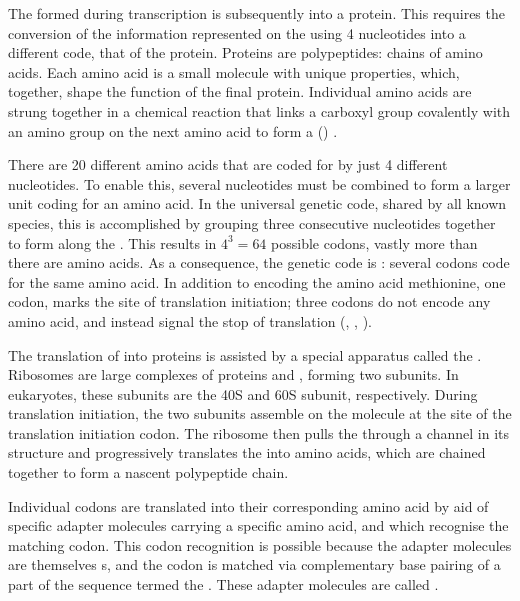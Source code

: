 The \mrna formed during transcription is subsequently  into a
protein. This requires the conversion of the information represented on the
\mrna using \num{4} nucleotides  into a different code, that of the protein.
Proteins are polypeptides: chains of amino acids. Each amino acid is a small
molecule with unique properties, which, together, shape the function of the
final protein. Individual amino acids are strung together in a chemical reaction
that links a carboxyl group covalently with an amino group on the next amino
acid to form a  ()
\citep{Alberts:2002}.

There are \num{20} different amino acids that are coded for by just \num{4}
different nucleotides. To enable this, several nucleotides must be combined to
form a larger unit coding for an amino acid. In the universal genetic code,
shared by all known species, this is accomplished by grouping three consecutive
nucleotides together to form  along the \mrna. This results in
\(4^3 = 64\) possible codons, vastly more than there are amino acids. As a
consequence, the genetic code is : several codons code for
the same amino acid. In addition to encoding the amino acid methionine, one
codon,  marks the site of translation initiation; three codons do not
encode any amino acid, and instead signal the stop of translation (,
, ).

The translation of \mrna into proteins is assisted by a special apparatus called
the . Ribosomes are large complexes of proteins and \rrna,
forming two subunits. In eukaryotes, these subunits are the 40S and 60S subunit,
respectively. During translation initiation, the two subunits assemble on the
\mrna molecule at the site of the translation initiation codon. The ribosome
then pulls the \mrna through a channel in its structure and progressively
translates the \mrna into amino acids, which are chained together to form a
nascent polypeptide chain.

Individual codons are translated into their corresponding amino acid by aid of
specific adapter molecules carrying a specific amino acid, and which recognise
the matching codon. This codon recognition is possible because the adapter
molecules are themselves s, and the codon is matched via complementary
base pairing of a part of the \rna sequence termed the . These
adapter molecules are called .

